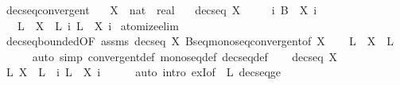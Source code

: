\begin{isabellebody}
{\isafoldproof}%
%
\isadelimproof
\isanewline
%
\endisadelimproof
\isanewline
{}\isamarkupfalse%
\ decseq{\isacharunderscore}{\kern0pt}convergent{\isacharcolon}{\kern0pt}\isanewline
\ \ \ X\ {\isacharcolon}{\kern0pt}{\isacharcolon}{\kern0pt}\ {\isachardoublequoteopen}nat\ {\isasymRightarrow}\ real{\isachardoublequoteclose}\isanewline
\ \ \ {\isachardoublequoteopen}decseq\ X{\isachardoublequoteclose}\isanewline
\ \ \ \ \ {\isachardoublequoteopen}{\isasymforall}i{\isachardot}{\kern0pt}\ B\ {\isasymle}\ X\ i{\isachardoublequoteclose}\isanewline
\ \ \ L\ \ {\isachardoublequoteopen}X\ {\isasymlonglonglongrightarrow}\ L{\isachardoublequoteclose}\ {\isachardoublequoteopen}{\isasymforall}i{\isachardot}{\kern0pt}\ L\ {\isasymle}\ X\ i{\isachardoublequoteclose}\isanewline
%
\isadelimproof
%
\endisadelimproof
%
\isatagproof
{}\isamarkupfalse%
\ atomize{\isacharunderscore}{\kern0pt}elim\isanewline
\ \ \isamarkupfalse%
\ decseq{\isacharunderscore}{\kern0pt}bounded{\isacharbrackleft}{\kern0pt}OF\ assms{\isacharbrackright}{\kern0pt}\ {\isacartoucheopen}decseq\ X{\isacartoucheclose}\ Bseq{\isacharunderscore}{\kern0pt}monoseq{\isacharunderscore}{\kern0pt}convergent{\isacharbrackleft}{\kern0pt}of\ X{\isacharbrackright}{\kern0pt}\isanewline
\ \ \isamarkupfalse%
\ L\ \ {\isachardoublequoteopen}X\ {\isasymlonglonglongrightarrow}\ L{\isachardoublequoteclose}\isanewline
\ \ \ \ \isamarkupfalse%
\ {\isacharparenleft}{\kern0pt}auto\ simp{\isacharcolon}{\kern0pt}\ convergent{\isacharunderscore}{\kern0pt}def\ monoseq{\isacharunderscore}{\kern0pt}def\ decseq{\isacharunderscore}{\kern0pt}def{\isacharparenright}{\kern0pt}\isanewline
\ \ \isamarkupfalse%
\ {\isacartoucheopen}decseq\ X{\isacartoucheclose}\ \isamarkupfalse%
\ {\isachardoublequoteopen}{\isasymexists}L{\isachardot}{\kern0pt}\ X\ {\isasymlonglonglongrightarrow}\ L\ {\isasymand}\ {\isacharparenleft}{\kern0pt}{\isasymforall}i{\isachardot}{\kern0pt}\ L\ {\isasymle}\ X\ i{\isacharparenright}{\kern0pt}{\isachardoublequoteclose}\isanewline
\ \ \ \ \isamarkupfalse%
\ {\isacharparenleft}{\kern0pt}auto\ intro{\isacharbang}{\kern0pt}{\isacharcolon}{\kern0pt}\ exI{\isacharbrackleft}{\kern0pt}of\ {\isacharunderscore}{\kern0pt}\ L{\isacharbrackright}{\kern0pt}\ decseq{\isacharunderscore}{\kern0pt}ge{\isacharparenright}{\kern0pt}\isanewline
{}\isamarkupfalse%
%
\endisatagproof
{\isafoldproof}%

\end{isabellebody}
